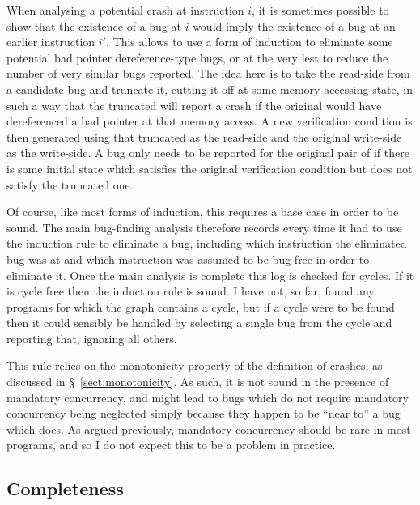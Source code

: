 When analysing a potential crash at instruction $i$, it is sometimes
possible to show that the existence of a bug at $i$ would imply the
existence of a bug at an earlier instruction $i'$.  This allows
{\technique} to use a form of induction to eliminate some potential
bad pointer dereference-type bugs, or at the very lest to reduce the
number of very similar bugs reported.  The idea here is to take the
read-side {\StateMachine} from a candidate bug and truncate it,
cutting it off at some memory-accessing state, in such a way that the
truncated {\StateMachine} will report a crash if the original
{\StateMachine} would have dereferenced a bad pointer at that memory
access.  A new verification condition is then generated using that
truncated {\StateMachine} as the read-side {\StateMachine} and the
original write-side {\StateMachine} as the write-side.  A bug only
needs to be reported for the original pair of {\StateMachines} if
there is some initial state which satisfies the original verification
condition but does not satisfy the truncated one.

Of course, like most forms of induction, this requires a base case in
order to be sound.  The main bug-finding analysis therefore records
every time it had to use the induction rule to eliminate a bug,
including which instruction the eliminated bug was at and which
instruction was assumed to be bug-free in order to eliminate it.  Once
the main analysis is complete this log is checked for cycles.  If it
is cycle free then the induction rule is sound.  I have not, so far,
found any programs for which the graph contains a cycle, but if a
cycle were to be found then it could sensibly be handled by selecting
a single bug from the cycle and reporting that, ignoring all others.

This rule relies on the monotonicity property of the definition of
crashes, as discussed in \S~\ref{sect:monotonicity}.  As such, it is
not sound in the presence of mandatory concurrency, and might lead to
bugs which do not require mandatory concurrency being neglected simply
because they happen to be ``near to'' a bug which does.  As argued
previously, mandatory concurrency should be rare in most programs, and
so I do not expect this to be a problem in practice.  


\subsection{Completeness}

